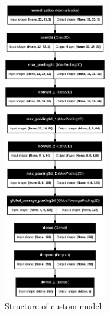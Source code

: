 \documentclass[runningheads]{llncs}
\begin{document}
\begin{figure}[H]
    \centering
    \includegraphics[height=13cm]{graphics/custom_model.png}
    \caption{Structure of custom model}
    \label{fig:custom-cnn}
\end{figure}
\end{document}
